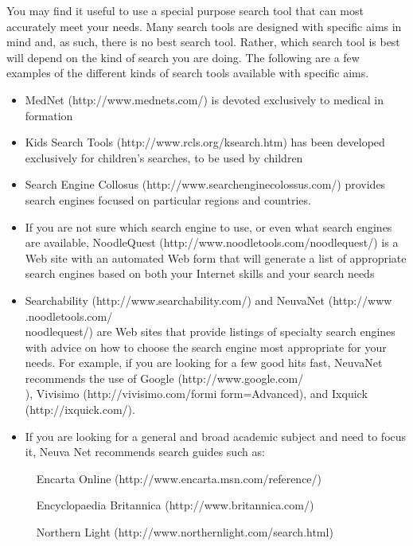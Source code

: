 \documentclass{article}
\begin{document}
You may find it useful to use a special purpose search tool that can most accurately meet your needs. Many search tools are designed with specific aims in mind and, as such, there is no best search tool. Rather, which search tool is best will depend on the kind of search you are doing. The following are a few examples of the different kinds of search tools available with specific aims.
\begin{itemize}
	\item
	MedNet (http://www.mednets.com/) is devoted exclusively to medical in
	formation 
	
	\item
	Kids Search Tools (http://www.rcls.org/ksearch.htm) has been developed exclusively for children's searches, to be used by children
	
	\item
	 Search Engine Collosus (http://www.searchenginecolossus.com/) provides
	 search engines focused on particular regions and countries.
	 
	\item
	If you are not sure which search engine to use, or even what search engines are
	available, NoodleQuest (http://www.noodletools.com/noodlequest/) is a Web site with an automated Web form that will generate a list of appropriate search engines based on both your Internet skills and your search needs
	
	\item
	Searchability (http://www.searchability.com/) and NeuvaNet (http://www .noodletools.com/\\noodlequest/) are Web sites that provide listings of specialty search engines with advice on how to choose the search engine most appropriate for your needs. For example, if you are looking for a few good hits fast, NeuvaNet recommends the use of Google (http://www.google.com/\\), Vivisimo (http://vivisimo.com/formi form=Advanced), and Ixquick (http://ixquick.com/).
	
	\item
	If you are looking for a general and broad academic subject and need to focus it, Neuva Net recommends search guides such as:
	
	$\quad$Encarta Online (http://www.encarta.msn.com/reference/)
	 
	$\quad$Encyclopaedia Britannica (http://www.britannica.com/) 
	
	$\quad$Northern Light (http://www.northernlight.com/search.html)
	 

\end{itemize}
\end{document}
